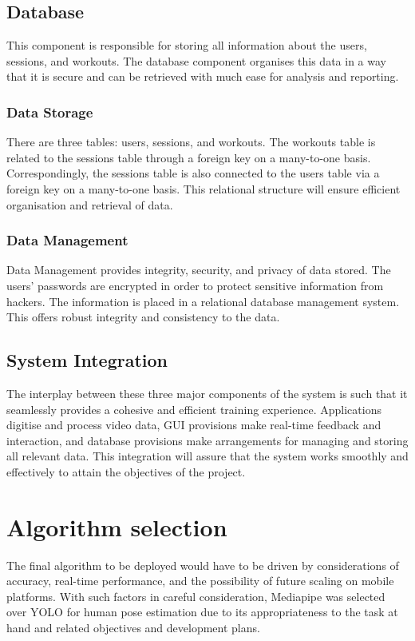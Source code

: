     \subsection{Database}
        This component is responsible for storing all information about the users, sessions, and workouts. The database component organises this data in a way that it is secure and can be retrieved with much ease for analysis and reporting.
        \subsubsection{Data Storage}
            There are three tables: users, sessions, and workouts. The workouts table is related to the sessions table through a foreign key on a many-to-one basis. Correspondingly, the sessions table is also connected to the users table via a foreign key on a many-to-one basis. This relational structure will ensure efficient organisation and retrieval of data.
        \subsubsection{Data Management}
            Data Management provides integrity, security, and privacy of data stored. The users' passwords are encrypted in order to protect sensitive information from hackers. The information is placed in a relational database management system. This offers robust integrity and consistency to the data.
    \subsection{System Integration}
        The interplay between these three major components of the system is such that it seamlessly provides a cohesive and efficient training experience. Applications digitise and process video data, GUI provisions make real-time feedback and interaction, and database provisions make arrangements for managing and storing all relevant data. This integration will assure that the system works smoothly and effectively to attain the objectives of the project.
\section{Algorithm selection} %
    The final algorithm to be deployed would have to be driven by considerations of accuracy, real-time performance, and the possibility of future scaling on mobile platforms. With such factors in careful consideration, Mediapipe was selected over YOLO for human pose estimation due to its appropriateness to the task at hand and related objectives and development plans.
